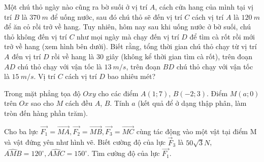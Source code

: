 \begin{ex}
 Một chú thỏ ngày nào cũng ra bờ suối ở vị trí $A$, cách cửa hang của mình tại vị trí $B$ là $370~m$ để uống nước, sau đó chú thỏ sẽ đến vị trí $C$ cách vị trí $A$ là $120~m$ để ăn cỏ rồi trở về hang. Tuy nhiên, hôm nay sau khi uống nước ở bờ suối, chú thỏ không đến vị trí $C$ như mọi ngày mà chạy đến vị trí $D$ để tìm cà rốt rồi mới trở về hang (xem hình bên dưới). Biết rằng, tổng thời gian chú thỏ chạy từ vị trí $A$ đến vị trí $D$ rồi về hang là 30 giây (không kể thời gian tìm cà rốt), trên đoạn $AD$ chú thỏ chạy với vận tốc là $13~m/s$, trên đoạn $BD$ chú thỏ chạy với vận tốc là $15~m/s$. Vị trí $C$ cách vị trí $D$ bao nhiêu mét?
\begin{center}
\end{center}
\loigiai{ }
\end{ex}\newpage
\begin{ex}%
Trong mặt phẳng tọa độ $Oxy$ cho các điểm $A(1;7)$, $B(-2;3)$. Điểm $M(a;0)$ trên $Ox$ sao cho $M$ cách đều $A$, $B$. Tính $a$ (kết quả để ở dạng thập phân, làm tròn đến hàng phần trăm).
\end{ex}\newpage
\begin{ex}
 Cho ba lực $\vec{F_1}=\vec{MA},\vec{F_2}=\vec{MB},\vec{F_3}=\vec{MC}$ cùng tác động vào một vật tại điểm M và vật đứng yên như hình vẽ. Biết cường độ của lực $\vec{F}_3$ là $50\sqrt{3}N$, $\widehat{AMB}=120^\circ,\widehat{AMC}={{150}^\circ}$. Tìm cường độ của lực $\vec{F_1}$.
\loigiai{ }
\end{ex}\newpage
{}